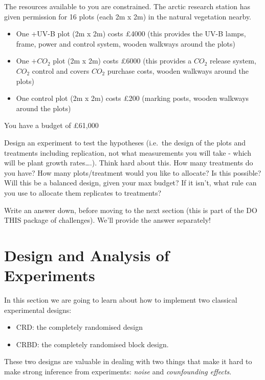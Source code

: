 \documentclass[
]{book}
\providecommand{\tightlist}{%
  \setlength{\itemsep}{0pt}\setlength{\parskip}{0pt}}
\begin{document}
The resources available to you are constrained. The arctic research station has given permission for 16 plots (each 2m x 2m) in the natural vegetation nearby.

\begin{itemize}
\tightlist
\item
  One +UV-B plot (2m x 2m) costs £4000 (this provides the UV-B lamps, frame, power and control system, wooden walkways around the plots)
\item
  One \(+CO_{2}\) plot (2m x 2m) costs £6000 (this provides a \(CO_{2}\) release system, \(CO_{2}\) control and covers \(CO_{2}\) purchase costs, wooden walkways around the plots)
\item
  One control plot (2m x 2m) costs £200 (marking posts, wooden walkways around the plots)
\end{itemize}

You have a budget of £61,000

Design an experiment to test the hypotheses (i.e.~the design of the plots and treatments including replication, not what measurements you will take - which will be plant growth rates\ldots.). Think hard about this. How many treatments do you have? How many plots/treatment would you like to allocate? Is this possible? Will this be a balanced design, given your max budget? If it isn't, what rule can you use to allocate them replicates to treatments?

Write an answer down, before moving to the next section (this is part of the DO THIS package of challenges). We'll provide the answer separately!

\hypertarget{design-and-analysis-of-experiments}{%
\chapter{Design and Analysis of Experiments}\label{design-and-analysis-of-experiments}}

In this section we are going to learn about how to implement two classical experimental designs:

\begin{itemize}
\tightlist
\item
  CRD: the completely randomised design
\item
  CRBD: the completely randomised block design.
\end{itemize}

These two designs are valuable in dealing with two things that make it hard to make strong inference from experiments: \emph{noise} and \emph{counfounding effects}.
\end{document}
